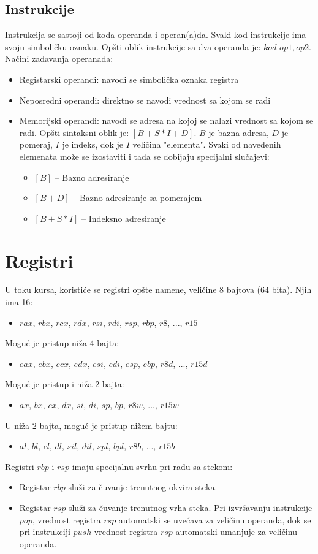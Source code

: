 \documentclass[a4paper, 10pt]{article}
\begin{document}
	\subsection{Instrukcije}
	Instrukcija se sastoji od koda operanda i operan(a)da. Svaki kod instrukcije ima svoju simboličku oznaku. Opšti oblik instrukcije sa dva operanda je: $kod$ $op1, op2$.
Načini zadavanja operanada:	
	\begin{itemize}
		\item Registarski operandi: navodi se simbolička oznaka registra
		\item Neposredni operandi: direktno se navodi vrednost sa kojom se radi
		\item Memorijski operandi: navodi se adresa na kojoj se nalazi vrednost sa kojom se radi. Opšti sintaksni oblik je: $[B + S*I + D]$. $B$ je bazna adresa, $D$ je pomeraj, $I$ je indeks, dok je $I$ veličina "elementa". Svaki od navedenih elemenata može se izostaviti i tada se dobijaju specijalni slučajevi:
		\begin{itemize}
			\item $[B]$ -- Bazno adresiranje
			\item $[B + D]$ -- Bazno adresiranje sa pomerajem
			\item $[B + S*I]$ -- Indeksno adresiranje
		\end{itemize}
	\end{itemize}
\section{Registri} 
U toku kursa, koristiće se registri opšte namene, veličine 8 bajtova (64 bita). Njih ima 16:
	\begin{itemize}
		\item $rax$, $rbx$, $rcx$, $rdx$, $rsi$, $rdi$, $rsp$, $rbp$, $r8$, ..., $r15$
	\end{itemize}
Moguć je pristup niža 4 bajta:
	\begin{itemize}
		\item $eax$, $ebx$, $ecx$, $edx$, $esi$, $edi$, $esp$, $ebp$, $r8d$, ..., $r15d$
	\end{itemize}
	Moguć je pristup i niža 2 bajta:
	\begin{itemize}
		\item $ax$, $bx$, $cx$, $dx$, $si$, $di$, $sp$, $bp$, $r8w$, ..., $r15w$
	\end{itemize}
	U niža 2 bajta, moguć je pristup nižem bajtu: 
	\begin{itemize}
		\item $al$, $bl$, $cl$, $dl$, $sil$, $dil$, $spl$, $bpl$, $r8b$, ..., $r15b$
	\end{itemize}
Registri $rbp$ i $rsp$ imaju specijalnu svrhu pri radu sa stekom:
	\begin{itemize}
			\item Registar $rbp$ služi za čuvanje trenutnog okvira steka.
			\item Registar $rsp$ služi za čuvanje trenutnog vrha steka. Pri izvršavanju instrukcije $pop$, vrednost registra $rsp$ automatski se uvećava za veličinu operanda, dok se pri instrukciji $push$ vrednost registra $rsp$ automatski umanjuje za veličinu operanda.
	\end{itemize}
\end{document}
